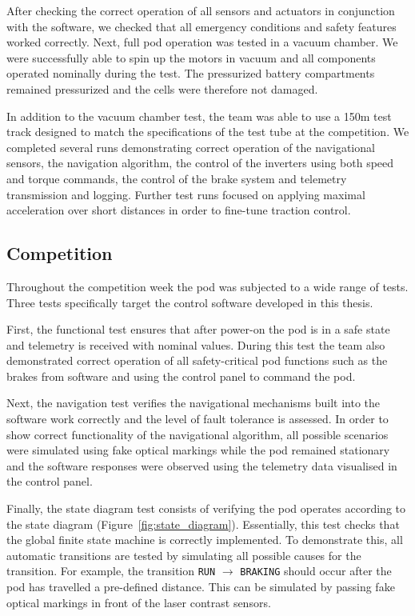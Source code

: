 After checking the correct operation of all sensors and actuators in conjunction with the software, we checked that all emergency conditions and safety features worked correctly. Next, full pod operation was tested in a vacuum chamber. We were successfully able to spin up the motors in vacuum and all components operated nominally during the test. The pressurized battery compartments remained pressurized and the cells were therefore not damaged.

In addition to the vacuum chamber test, the team was able to use a 150m test track designed to match the specifications of the test tube at the competition. We completed several runs demonstrating correct operation of the navigational sensors, the navigation algorithm, the control of the inverters using both speed and torque commands, the control of the brake system and telemetry transmission and logging. Further test runs focused on applying maximal acceleration over short distances in order to fine-tune traction control.

\subsection{Competition}


Throughout the competition week the pod was subjected to a wide range of tests. Three tests specifically target the control software developed in this thesis.

First, the functional test ensures that after power-on the pod is in a safe state and telemetry is received with nominal values. During this test the team also demonstrated correct operation of all safety-critical pod functions such as the brakes from software and using the control panel to command the pod.

Next, the navigation test verifies the navigational mechanisms built into the software work correctly and the level of fault tolerance is assessed. In order to show correct functionality of the navigational algorithm, all possible scenarios were simulated using fake optical markings while the pod remained stationary and the software responses were observed using the telemetry data visualised in the control panel.

Finally, the state diagram test consists of verifying the pod operates according to the state diagram (Figure~\ref{fig:state_diagram}). Essentially, this test checks that the global finite state machine is correctly implemented. To demonstrate this, all automatic transitions are tested by simulating all possible causes for the transition. For example, the transition \texttt{RUN} $\rightarrow$ \texttt{BRAKING} should occur after the pod has travelled a pre-defined distance. This can be simulated by passing fake optical markings in front of the laser contrast sensors.

